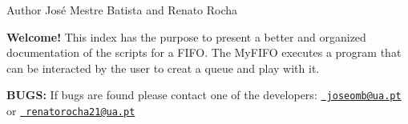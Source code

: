 \begin{DoxyAuthor}{Author}
José Mestre Batista and Renato Rocha
\end{DoxyAuthor}
{\bfseries{Welcome!}} This index has the purpose to present a better and organized documentation of the scripts for a F\+I\+FO. The My\+F\+I\+FO executes a program that can be interacted by the user to creat a queue and play with it.

{\bfseries{B\+U\+GS\+:}} If bug\textquotesingle{}s are found please contact one of the developers\+: \href{mailto:joseomb@ua.pt}{\texttt{ joseomb@ua.\+pt}} or \href{mailto:renatorocha21@ua.pt}{\texttt{ renatorocha21@ua.\+pt}} 